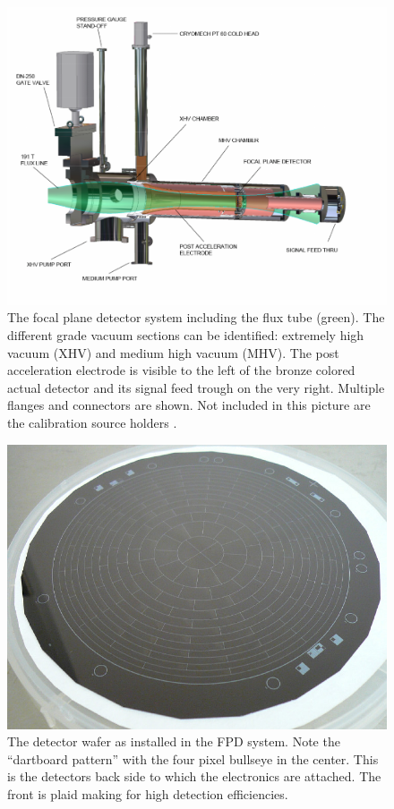       
      \begin{figure}
      \centering
	\includegraphics[width = 0.8 \textwidth]{graphics/katrinExperiment/detectorHousing.pdf}
	\caption[Focal Plane Detector system]{The focal plane detector system including the flux tube (green). The different grade vacuum sections can be identified: extremely high vacuum (XHV) and medium high vacuum (MHV). The post acceleration electrode is visible to the left of the bronze colored actual detector and its signal feed trough on the very right. Multiple flanges and connectors are shown. Not included in this picture are the calibration source holders \cite{FPD}.}
	\label{fig:katrinExperiment:detectorHousing}
      \end{figure}
      
      \begin{figure}
      \centering
      	\includegraphics[width = 0.7 \textwidth]{graphics/katrinExperiment/detectorWafer.jpg}
	  \caption[Detector wafer]{The detector wafer as installed in the FPD system. Note the ``dartboard pattern'' with the four pixel bullseye in the center. This is the detectors back side to which the electronics are attached. The front is plaid making for high detection efficiencies.}
	  \label{fig:katrinExperiment:detectorWafer}
      \end{figure}
      
